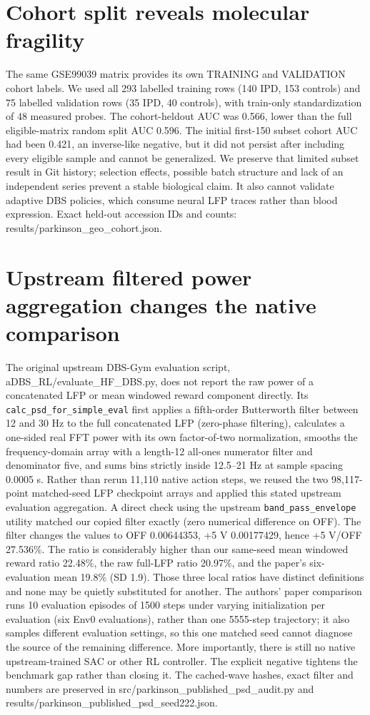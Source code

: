 \section{Cohort split reveals molecular fragility}
The same GSE99039 matrix provides its own TRAINING and VALIDATION cohort labels. We used all 293 labelled training rows (140 IPD, 153 controls) and 75 labelled validation rows (35 IPD, 40 controls), with train-only standardization of 48 measured probes. The cohort-heldout AUC was 0.566, lower than the full eligible-matrix random split AUC 0.596. The initial first-150 subset cohort AUC had been 0.421, an inverse-like negative, but it did not persist after including every eligible sample and cannot be generalized. We preserve that limited subset result in Git history; selection effects, possible batch structure and lack of an independent series prevent a stable biological claim. It also cannot validate adaptive DBS policies, which consume neural LFP traces rather than blood expression. Exact held-out accession IDs and counts: results/parkinson\_geo\_cohort.json.

\section{Upstream filtered power aggregation changes the native comparison}
The original upstream DBS-Gym evaluation script, aDBS\_RL/evaluate\_HF\_DBS.py, does not report the raw power of a concatenated LFP or mean windowed reward component directly. Its \texttt{calc\_psd\_for\_simple\_eval} first applies a fifth-order Butterworth filter between 12 and 30 Hz to the full concatenated LFP (zero-phase filtering), calculates a one-sided real FFT power with its own factor-of-two normalization, smooths the frequency-domain array with a length-12 all-ones numerator filter and denominator five, and sums bins strictly inside 12.5--21 Hz at sample spacing 0.0005 s. Rather than rerun 11,110 native action steps, we reused the two 98,117-point matched-seed LFP checkpoint arrays and applied this stated upstream evaluation aggregation. A direct check using the upstream \texttt{band\_pass\_envelope} utility matched our copied filter exactly (zero numerical difference on OFF). The filter changes the values to OFF 0.00644353, +5 V 0.00177429, hence +5 V/OFF 27.536\%. The ratio is considerably higher than our same-seed mean windowed reward ratio 22.48\%, the raw full-LFP ratio 20.97\%, and the paper's six-evaluation mean 19.8\% (SD 1.9). Those three local ratios have distinct definitions and none may be quietly substituted for another. The authors' paper comparison runs 10 evaluation episodes of 1500 steps under varying initialization per evaluation (six Env0 evaluations), rather than one 5555-step trajectory; it also samples different evaluation settings, so this one matched seed cannot diagnose the source of the remaining difference. More importantly, there is still no native upstream-trained SAC or other RL controller. The explicit negative tightens the benchmark gap rather than closing it. The cached-wave hashes, exact filter and numbers are preserved in src/parkinson\_published\_psd\_audit.py and results/parkinson\_published\_psd\_seed222.json.


